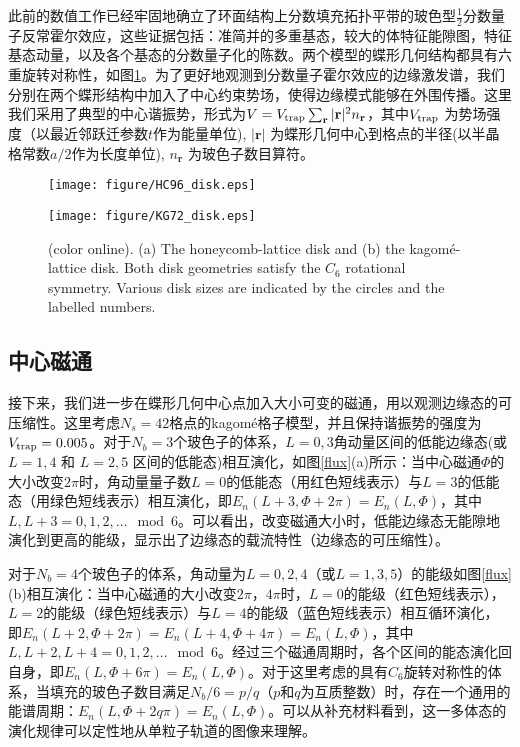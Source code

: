 此前的数值工作已经牢固地确立了环面结构上分数填充拓扑平带的玻色型$\frac{1}{2}$分数量子反常霍尔效应，这些证据包括：准简并的多重基态，较大的体特征能隙图，特征基态动量，以及各个基态的分数量子化的陈数。两个模型的蝶形几何结构都具有六重旋转对称性，如图\ref{fig:disk}。为了更好地观测到分数量子霍尔效应的边缘激发谱，我们分别在两个蝶形结构中加入了中心约束势场，使得边缘模式能够在外围传播。这里我们采用了典型的中心谐振势，形式为$V = V_{\rm trap}\sum_{\mathbf{r}} |\mathbf{r}|^2 n_{\mathbf{r}}$，其中$V_{\rm trap}$ 为势场强度（以最近邻跃迁参数$t$作为能量单位), $|{\mathbf{r}}|$ 为蝶形几何中心到格点的半径(以半晶格常数$a/2$作为长度单位),  $n_{\mathbf{r}}$ 为玻色子数目算符。

\begin{figure}[!tb]
  \centering
  \begin{minipage}[c]{0.45\textwidth}
  \texttt{[image: figure/HC96\_disk.eps]}
\end{minipage}
\hfill
  \begin{minipage}[c]{0.45\textwidth}
  \texttt{[image: figure/KG72\_disk.eps]}
\end{minipage}
  \caption{(color online). (a) The honeycomb-lattice disk and (b) the kagom\'{e}-lattice disk. Both disk geometries satisfy the $C_6$ rotational symmetry. Various disk sizes are indicated by the circles and the labelled numbers.}
\label{fig:disk}
\end{figure}



\subsection{中心磁通}
接下来，我们进一步在蝶形几何中心点加入大小可变的磁通，用以观测边缘态的可压缩性。这里考虑$N_s=42$格点的kagom\'{e}格子模型，并且保持谐振势的强度为$V_{\rm trap}=0.005$。对于$N_b=3$个玻色子的体系，$L= 0, 3$角动量区间的低能边缘态(或 $L= 1, 4$ 和 $L= 2, 5$ 区间的低能态)相互演化，如图\ref{flux}(a)所示：当中心磁通$\Phi$的大小改变$2\pi$时，角动量量子数$L= 0$的低能态（用红色短线表示）与$L= 3$的低能态（用绿色短线表示）相互演化，即$E_n(L+3,\Phi+2\pi)=E_n(L,\Phi)$，其中$L,L+3=0,1,2,\dots\mod 6$。可以看出，改变磁通大小时，低能边缘态无能隙地演化到更高的能级，显示出了边缘态的载流特性（边缘态的可压缩性）。

对于$N_b=4$个玻色子的体系，角动量为$L= 0, 2, 4$（或$L= 1, 3, 5$）的能级如图\ref{flux}(b)相互演化：当中心磁通的大小改变$2\pi$，$4\pi$时，$L= 0$的能级（红色短线表示），$L= 2$的能级（绿色短线表示）与$L= 4$的能级（蓝色短线表示）相互循环演化，即$E_n(L+2,\Phi+2\pi)=E_n(L+4,\Phi+4\pi)=E_n(L,\Phi)$，其中$L,L+2,L+4=0,1,2,\dots\mod 6$。经过三个磁通周期时，各个区间的能态演化回自身，即$E_n(L,\Phi+6\pi)=E_n(L,\Phi)$。对于这里考虑的具有$C_6$旋转对称性的体系，当填充的玻色子数目满足$N_b/6=p/q$（$p$和$q$为互质整数）时，存在一个通用的能谱周期：$E_n(L,\Phi+2q\pi)=E_n(L,\Phi)$。可以从补充材料\cite{supply}看到，这一多体态的演化规律可以定性地从单粒子轨道的图像来理解。


